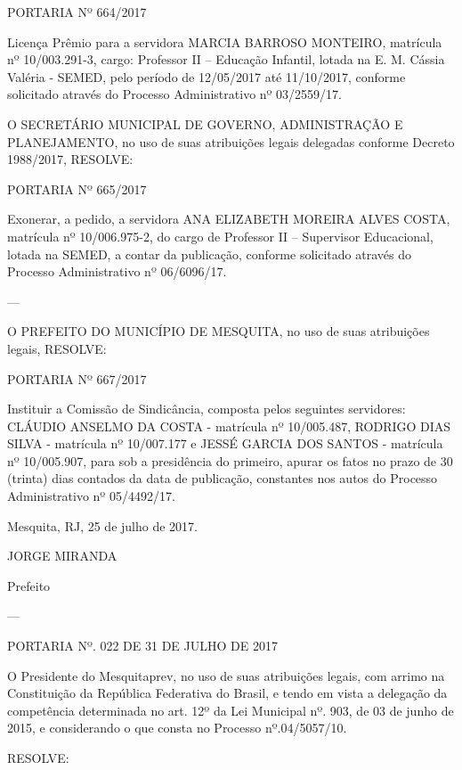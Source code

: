 \documentclass{doliberto}
\begin{document}
PORTARIA Nº 664/2017 
 
Licença  Prêmio  para  a  servidora  MARCIA  BARROSO 
MONTEIRO, matrícula nº 10/003.291-3, cargo: Professor II 
– Educação Infantil, lotada na E. M. Cássia Valéria - SEMED, 
pelo  período  de  12/05/2017  até  11/10/2017,  conforme 
solicitado  através  do  Processo  Administrativo  nº 
03/2559/17. 
 
O  SECRETÁRIO  MUNICIPAL  DE  GOVERNO, 
ADMINISTRAÇÃO E PLANEJAMENTO, no uso de 
suas  atribuições 
legais  delegadas  conforme 
Decreto 1988/2017,  
RESOLVE: 
 
PORTARIA Nº 665/2017 
 
Exonerar,  a  pedido,  a  servidora  ANA  ELIZABETH 
MOREIRA  ALVES  COSTA,  matrícula  nº  10/006.975-2,  do 
cargo  de  Professor  II  –  Supervisor  Educacional,  lotada  na 
SEMED, a contar da publicação, conforme solicitado através 
do Processo Administrativo nº 06/6096/17. 

---

O PREFEITO DO MUNICÍPIO DE MESQUITA, no 
uso de suas atribuições legais, 
RESOLVE: 
 
PORTARIA Nº 667/2017 
 
Instituir  a  Comissão  de  Sindicância,  composta  pelos 
seguintes  servidores:  CLÁUDIO  ANSELMO  DA  COSTA  - 
matrícula  nº  10/005.487,  RODRIGO  DIAS  SILVA 
- 
matrícula  nº  10/007.177  e  JESSÉ  GARCIA  DOS  SANTOS  - 
matrícula  nº  10/005.907,  para  sob  a  presidência  do 
primeiro,  apurar  os  fatos  no  prazo  de  30  (trinta)  dias 
contados  da  data  de  publicação,  constantes  nos  autos  do 
Processo Administrativo nº 05/4492/17. 


Mesquita, RJ, 25 de julho de 2017. 

JORGE MIRANDA 

Prefeito 

---

PORTARIA Nº. 022 DE 31 DE JULHO DE 2017 

 

O  Presidente  do  Mesquitaprev,  no  uso  de  suas  atribuições 
legais, com arrimo na Constituição da República Federativa 
do  Brasil,  e  tendo  em  vista  a  delegação  da  competência 
determinada no art. 12º da Lei Municipal nº. 903, de 03 de 
junho  de  2015,  e  considerando  o  que  consta  no  Processo 
nº.04/5057/10. 
                                                                                                                                      
RESOLVE: 
 
\end{document}
